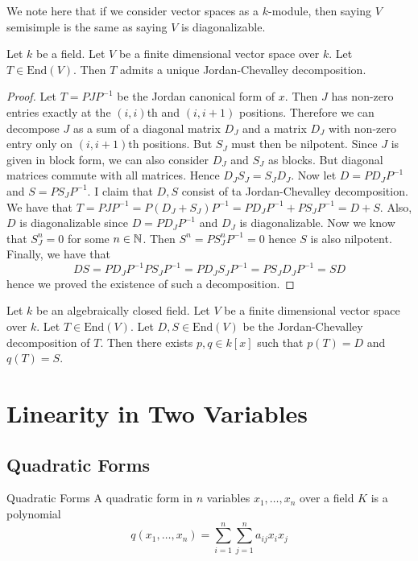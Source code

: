 \documentclass[a4paper]{article}
\begin{document}
We note here that if we consider vector spaces as a $k$-module, then saying $V$ semisimple is the same as saying $V$ is diagonalizable. 

\begin{prp}{}{} Let $k$ be a field. Let $V$ be a finite dimensional vector space over $k$. Let $T\in\text{End}(V)$. Then $T$ admits a unique Jordan-Chevalley decomposition. \tcbline
\begin{proof}
Let $T=PJP^{-1}$ be the Jordan canonical form of $x$. Then $J$ has non-zero entries exactly at the $(i,i)$th and $(i,i+1)$ positions. Therefore we can decompose $J$ as a sum of a diagonal matrix $D_J$ and a matrix $D_J$ with non-zero entry only on $(i,i+1)$th positions. But $S_J$ must then be nilpotent. Since $J$ is given in block form, we can also consider $D_J$ and $S_J$ as blocks. But diagonal matrices commute with all matrices. Hence $D_JS_J=S_JD_J$. Now let $D=PD_JP^{-1}$ and $S=PS_JP^{-1}$. I claim that $D,S$ consist of ta Jordan-Chevalley decomposition. We have that $T=PJP^{-1}=P(D_J+S_J)P^{-1}=PD_JP^{-1}+PS_JP^{-1}=D+S$. Also, $D$ is diagonalizable since $D=PD_JP^{-1}$ and $D_J$ is diagonalizable. Now we know that $S_J^n=0$ for some $n\in\mathbb{N}$. Then $S^n=PS_J^nP^{-1}=0$ hence $S$ is also nilpotent. Finally, we have that $$DS=PD_JP^{-1}PS_JP^{-1}=PD_JS_JP^{-1}=PS_JD_JP^{-1}=SD$$ hence we proved the existence of such a decomposition. 
\end{proof}
\end{prp}

\begin{prp}{}{} Let $k$ be an algebraically closed field. Let $V$ be a finite dimensional vector space over $k$. Let $T\in\text{End}(V)$. Let $D,S\in\text{End}(V)$ be the Jordan-Chevalley decomposition of $T$. Then there exists $p,q\in k[x]$ such that $p(T)=D$ and $q(T)=S$. 
\end{prp}

\pagebreak
\section{Linearity in Two Variables}
\subsection{Quadratic Forms}
\begin{defn}{Quadratic Forms}{} A quadratic form in $n$ variables $x_1,\dots,x_n$ over a field $K$ is a polynomial $$q(x_1,\dots,x_n)=\sum_{i=1}^n\sum_{j=1}^na_{ij}x_ix_j$$
\end{defn}
\end{document}
